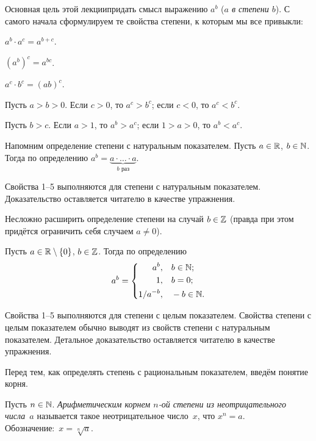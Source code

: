 \documentclass[a4paper,12pt,fleqn]{article}
\begin{document}
\vspace*{-1.7cm}

Основная цель этой лекции\т придать смысл выражению $a^b$ (\emph{$a$ в степени $b$}). С самого начала сформулируем те свойства степени, к которым мы все привыкли:
\begin{nums}{-3}
\item
\label{additivity}
$a^b \cdot a^c = a^{b+c}$.
\item
\label{composition}
$(a^b)^c = a^{bc}$.
\item
\label{multiplicativity}
$a^c \cdot b^c = (ab)^c$.
\item
\label{base_monotoneness}
Пусть $a > b > 0$. Если $c > 0$, то $a^c > b^c$; если $c < 0$, то $a^c < b^c$.
\item
\label{exponent_monotoneness}
Пусть $b > c$. Если $a > 1$, то $a^b > a^c$; если $1 > a > 0$, то $a^b < a^c$.
\end{nums}

Напомним определение степени с натуральным показателем.
\label{natural}
Пусть $a\in\mathbb{R}$, $b\in\mathbb{N}$. Тогда по определению $a^b = \underbrace{a\cdot\ldots\cdot a}_{b\text{ раз}}$.

Свойства 1--5 выполняются для степени с натуральным показателем.
Доказательство оставляется читателю в качестве упражнения.

Несложно расширить определение степени на случай $b \in \mathbb{Z}$ (правда при этом придётся ограничить себя случаем $a \ne 0$).

\label{integer}
Пусть $a\in\mathbb{R}\setminus\{0\}$, $b\in\mathbb{Z}$. Тогда по определению
\[
a^b = \left\{\begin{aligned}
a^b,&\quad b\in\mathbb{N};\\
1,&\quad b=0;\\
1/a^{-b},&\quad -b\in\mathbb{N}.\\
\end{aligned}\right.
\]

Свойства 1--5 выполняются для степени с целым показателем.
Свойства степени с целым показателем обычно выводят из свойств степени с натуральным показателем. Детальное доказательство оставляется читателю в качестве упражнения.

Перед тем, как определять степень с рациональным показателем, введём понятие корня.

Пусть $n\in\mathbb{N}$. \emph{Арифметическим корнем $n$-ой степени из неотрицательного числа~$a$} называется такое неотрицательное число~$x$, что $x^n=a$.\\ Обозначение:~$x=\sqrt[n]a$.
\end{document}
